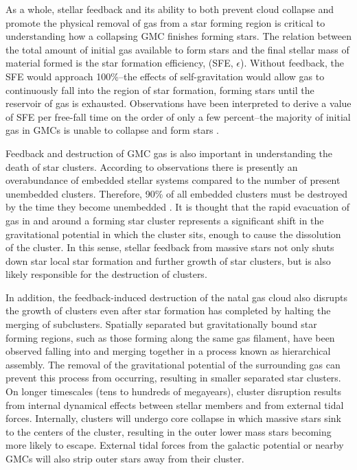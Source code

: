 \documentclass[twoside]{drexel-thesis}
\begin{document}
\begin{thesis}
As a whole, stellar feedback and its ability to both prevent cloud collapse and promote the physical removal of gas from a star forming region is critical to understanding how a collapsing GMC finishes forming stars. The relation between the total amount of initial gas available to form stars and the final stellar mass of material formed is the star formation efficiency, (SFE, $\epsilon$). Without feedback, the SFE would approach 100\%--the effects of self-gravitation would allow gas to continuously fall into the region of star formation,  forming stars until the reservoir of gas is exhausted. Observations have been interpreted to derive a value of SFE per free-fall time on the order of only a few percent--the majority of initial gas in GMCs is unable to collapse and form stars \citep{krumholz_big_2014}. 

Feedback and destruction of GMC gas is also important in understanding the death of star clusters. According to observations there is presently an overabundance of embedded stellar systems compared to the number of present unembedded clusters. Therefore, 90\% of all embedded clusters must be destroyed by the time they become unembedded \citep{lada_embedded_2003}. It is thought that the rapid evacuation of gas in and around a forming star cluster represents a significant shift in the gravitational potential in which the cluster sits, enough to cause the dissolution of the cluster. In this sense, stellar feedback from massive stars not only shuts down star local star formation and further growth of star clusters, but is also likely responsible for the destruction of clusters. 

In addition, the feedback-induced destruction of the natal gas cloud also disrupts the growth of clusters even after star formation has completed by halting the merging of subclusters. Spatially separated but gravitationally bound star forming regions, such as those forming along the same gas filament, have been observed falling into and merging together in a process known as hierarchical assembly. The removal of the gravitational potential of the surrounding gas can prevent this process from occurring, resulting in smaller separated star clusters. On longer timescales (tens to hundreds of megayears), cluster disruption results from internal dynamical effects between stellar members and from external tidal forces. Internally, clusters will undergo core collapse in which massive stars sink to the centers of the cluster, resulting in the outer lower mass stars becoming more likely to escape. External tidal forces from the galactic potential or nearby GMCs will also strip outer stars away from their cluster.


\end{thesis}
\end{document}
